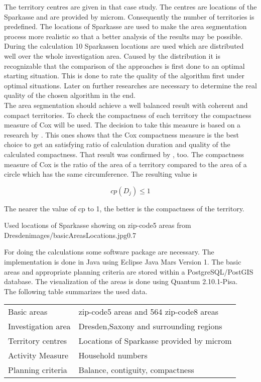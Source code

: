 The territory centres are given in that case study. The centres are locations of the Sparkasse and are provided by microm. Consequently the number of territories is predefined. The locations of Sparkasse are used to make the area segmentation process more realistic so that a better analysis of the results may be possible. During the calculation 10 Sparkassen locations are used which are distributed well over the whole investigation area. Caused by the distribution it is recognizable that the comparison of the approaches is first done to an optimal starting situation. This is done to rate the quality of the algorithm first under optimal situations. Later on further researches are necessary to determine the real quality of the chosen algorithm in the end. \\
The area segmentation should achieve a well balanced result with coherent and compact territories. To check the compactness of each territory the compactness measure of Cox will be used. The decision to take this measure is based on a research by \citeauthor{koehler} \cite{koehler}. This ones shows that the Cox compactness measure is the best choice to get an satisfying ratio of calculation duration and quality of the calculated compactness. That result was confirmed by \citeauthor{kit_com} \cite{kit_com}, too. The compactness measure of Cox is the ratio of the area of a territory compared to the area of a circle which has the same circumference. The resulting value is

\[ \mathit{cp(D_{j})  \leq   1}\]


The nearer the value of cp to 1, the better is the compactness of the territory.

\begin{figurevarSize}{Used locations of Sparkasse showing on zip-code5 areas from Dresden}{images/basicAreasLocations.jpg}{0.7}\end{figurevarSize}

For doing the calculations some software package are necessary. The implementation is done in Java using Eclipse Java Mars Version 1. The basic areas and appropriate planning criteria are stored within a PostgreSQL/PostGIS database. The visualization of the areas is done using Quantum 2.10.1-Pisa. \\
The following table summarizes the used data.



\begin{table}[H]
	\begin{tabular}{|p{3.5cm}|>{\RaggedRight}p{9.5cm}|}
		\hline
		& \centering{Detailed information} \tabularnewline
		\hline
		Basic areas & 37 zip-code5 areas and 564 zip-code8 areas
		\tabularnewline
		\hline
		Investigation area & Dresden,Saxony and surrounding regions
		\tabularnewline
		\hline
		Territory centres & Locations of Sparkasse provided by microm
		\tabularnewline
		\hline
		Activity Measure & Household numbers
		\tabularnewline
		\hline
		Planning criteria & Balance, contiguity, compactness
		\tabularnewline
		\hline
	\end{tabular}
\end{table}


